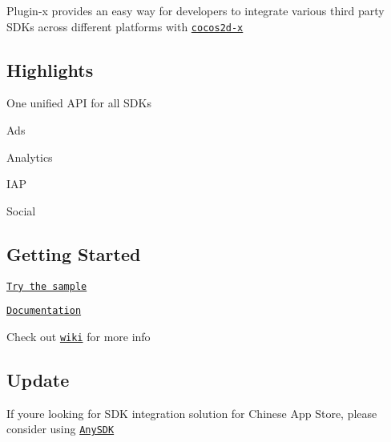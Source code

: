 Plugin-\/x provides an easy way for developers to integrate various third party S\+D\+Ks across different platforms with \href{https://github.com/cocos2d/cocos2d-x}{\tt cocos2d-\/x}

\subsection*{Highlights}

One unified A\+PI for all S\+D\+Ks
\begin{DoxyItemize}
\item Ads
\item Analytics
\item I\+AP
\item Social
\end{DoxyItemize}

\subsection*{Getting Started}


\begin{DoxyItemize}
\item \href{https://github.com/cocos2d-x/plugin-x/wiki/Sample}{\tt Try the sample}
\item \href{http://www.cocos2d-x.org/wiki/Third_Party_SDK_Integration}{\tt Documentation}
\item Check out \href{https://github.com/cocos2d-x/plugin-x/wiki}{\tt wiki} for more info
\end{DoxyItemize}

\subsection*{Update}


\begin{DoxyItemize}
\item If you\textquotesingle{}re looking for S\+DK integration solution for Chinese App Store, please consider using \href{http://www.anysdk.com}{\tt Any\+S\+DK} 
\end{DoxyItemize}